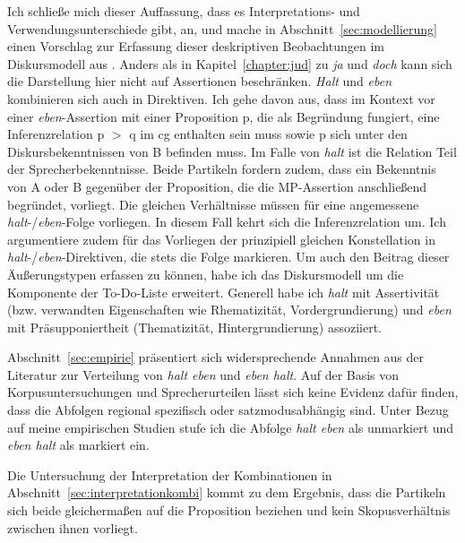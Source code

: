 Ich schließe mich dieser Auffassung, dass es Interpretations- und Verwendungs\-unterschiede gibt, an, und mache in Abschnitt~\ref{sec:modellierung} einen Vorschlag zur Erfassung dieser deskriptiven Beobachtungen im Diskursmodell aus \citet{Farkas2010}. Anders als in Kapitel~\ref{chapter:jud} zu \textit{ja} und \textit{doch} kann sich die Darstellung hier nicht auf Assertionen beschränken. \textit{Halt} und \textit{eben} kombinieren sich auch in  Direktiven. Ich gehe davon aus, dass im Kontext vor einer \textit{eben}-Assertion mit einer Proposition p, die als Begründung fungiert, eine Inferenzrelation  p $>$ q im cg enthalten sein muss sowie p sich unter den Diskursbekenntnissen von B befinden muss. Im Falle von \textit{halt} ist die Relation Teil der Sprecherbekenntnisse. Beide Partikeln fordern zudem, dass ein Bekenntnis von A oder B gegenüber der Proposition, die die MP-Assertion anschließend begründet, vorliegt. Die gleichen Verhältnisse müssen für eine angemessene \textit{halt}-/\textit{eben}-Folge vorliegen. In diesem Fall kehrt sich die Inferenzrelation um. Ich argumentiere zudem für das Vorliegen der prinzipiell gleichen Konstellation in \textit{halt}-/\textit{eben}-Direktiven, die stets die Folge markieren. Um auch den Beitrag dieser Äußerungstypen erfassen zu können, habe ich das Diskursmodell um die Komponente der To-Do-Liste  erweitert. Generell habe ich \textit{halt} mit Assertivität  (bzw. verwandten Eigenschaften wie  Rhematizität,  Vordergrundierung) und \textit{eben} mit  Präsupponiertheit (Thematizität, Hintergrundierung)   assoziiert.

Abschnitt~\ref{sec:empirie} präsentiert sich widersprechende Annahmen aus der Literatur zur Verteilung von \textit{halt eben} und \textit{eben halt}. Auf der Basis von Korpusuntersuchungen und Sprecherurteilen lässt sich keine Evidenz dafür finden, dass die Abfolgen regional spezifisch oder satzmodusabhängig sind. Unter Bezug auf meine empirischen Studien stufe ich die Abfolge \textit{halt eben} als unmarkiert und \textit{eben halt} als markiert ein. 

Die Untersuchung der Interpretation der Kombinationen in Abschnitt~\ref{sec:interpretationkombi} kommt zu dem Ergebnis, dass die Partikeln sich beide gleichermaßen auf die Proposition beziehen und kein Skopusverhältnis  zwischen ihnen vorliegt. 

